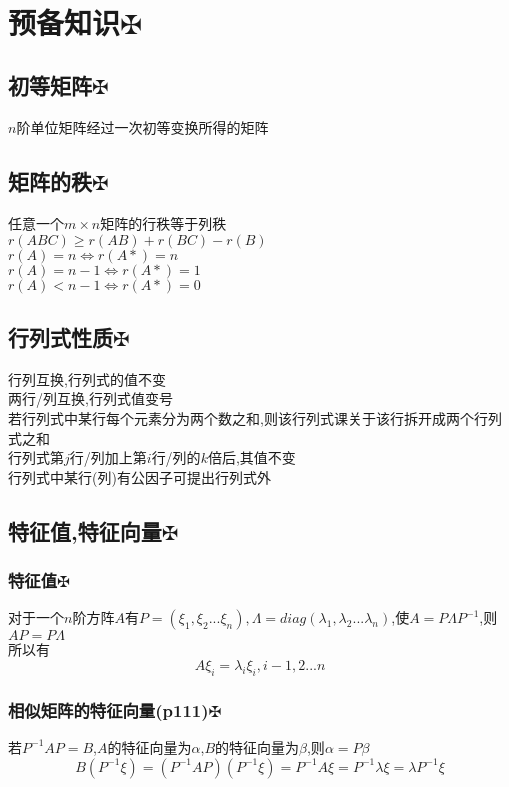 \documentclass[11pt, a4paper, UTF8]{ctexart}
\begin{document}
\indent\\
\large
\raggedright
\def\fuck{\maltese}
\def\shit#1{#1\protect\hyperlink{catalog}{$\fuck$}}
\hypertarget{catalog}{}
\tableofcontents
\setcounter{secnumdepth}{-1}
\section{\shit{预备知识}}
\subsection{\shit{初等矩阵}}
$n$阶单位矩阵经过一次初等变换所得的矩阵
\subsection{\shit{矩阵的秩}}
任意一个$m\times n$矩阵的行秩等于列秩\\
$r(ABC)\ge r(AB)+r(BC)-r(B)$\\
$r(A)=n\Leftrightarrow r(A*)=n$\\
$r(A)=n-1\Leftrightarrow r(A*)=1$\\
$r(A)<n-1\Leftrightarrow r(A*)=0$\\
\subsection{\shit{行列式性质}}
行列互换,行列式的值不变\\
两行/列互换,行列式值变号\\
若行列式中某行每个元素分为两个数之和,则该行列式课关于该行拆开成两个行列式之和\\
行列式第$j$行/列加上第$i$行/列的$k$倍后,其值不变\\
行列式中某行(列)有公因子可提出行列式外
\subsection{\shit{特征值,特征向量}}
\subsubsection{\shit{特征值}}
对于一个$n$阶方阵$A$有$P=(\xi_1,\xi_2...\xi_n),\varLambda=diag(\lambda_1,\lambda_2...\lambda_n)$,使$A=P\varLambda P^{-1}$,则$AP=P\varLambda$\\
所以有
\[A\xi_i=\lambda_i\xi_i,i-1,2...n\]
\subsubsection{\shit{相似矩阵的特征向量(p111)}}
若$P^{-1}AP=B$,$A$的特征向量为$\alpha$,$B$的特征向量为$\beta$,则$\alpha=P\beta$\\
\[B(P^{-1}\xi)=(P^{-1}AP)(P^{-1}\xi)=P^{-1}A\xi=P^{-1}\lambda\xi=\lambda P^{-1}\xi\]
\end{document}
